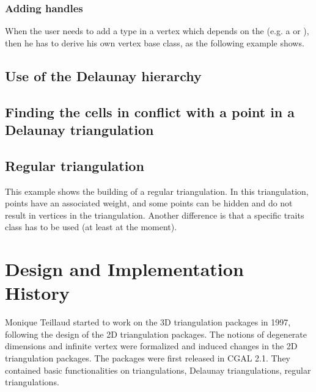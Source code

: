 \subsubsection{Adding handles}
When the user needs to add a type in a vertex which depends on the
 (e.g. a  or
), then he has to derive his own vertex base class,
as the following example shows.


\subsection{Use of the Delaunay hierarchy}


\subsection{Finding the cells in conflict with a point in a Delaunay
triangulation}


\subsection{Regular triangulation}
This example shows the building of a regular triangulation.  In this
triangulation, points have an associated weight, and some points can
be hidden and do not result in vertices in the triangulation.
Another difference is that a specific traits class has to be used
(at least at the moment).


\section{Design and Implementation History}

Monique Teillaud started to work on the 3D triangulation packages in
1997, following the design of the 2D triangulation packages. The
notions of degenerate dimensions and infinite vertex were formalized
\cite{t-tdtc-99} and induced changes in the 2D triangulation
packages. The packages were first released in CGAL 2.1. They contained
basic functionalities on triangulations, Delaunay triangulations,
regular triangulations.

